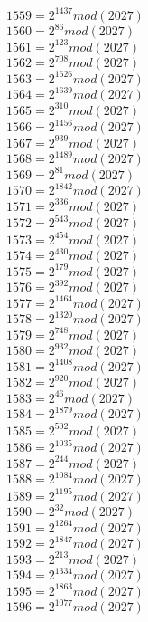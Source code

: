 \documentclass[12pt, letterpaper]{article}
\begin{document}
\begin{itemize}
\begin{multicols}{3}
$1559= 2^{1437} mod (2027)$\\
$1560= 2^{86} mod (2027)$\\
$1561= 2^{123} mod (2027)$\\
$1562= 2^{708} mod (2027)$\\
$1563= 2^{1626} mod (2027)$\\
$1564= 2^{1639} mod (2027)$\\
$1565= 2^{310} mod (2027)$\\
$1566= 2^{1456} mod (2027)$\\
$1567= 2^{939} mod (2027)$\\
$1568= 2^{1489} mod (2027)$\\
$1569= 2^{81} mod (2027)$\\
$1570= 2^{1842} mod (2027)$\\
$1571= 2^{336} mod (2027)$\\
$1572= 2^{543} mod (2027)$\\
$1573= 2^{454} mod (2027)$\\
$1574= 2^{430} mod (2027)$\\
$1575= 2^{179} mod (2027)$\\
$1576= 2^{392} mod (2027)$\\
$1577= 2^{1464} mod (2027)$\\
$1578= 2^{1320} mod (2027)$\\
$1579= 2^{748} mod (2027)$\\
$1580= 2^{932} mod (2027)$\\
$1581= 2^{1408} mod (2027)$\\
$1582= 2^{920} mod (2027)$\\
$1583= 2^{46} mod (2027)$\\
$1584= 2^{1879} mod (2027)$\\
$1585= 2^{502} mod (2027)$\\
$1586= 2^{1035} mod (2027)$\\
$1587= 2^{244} mod (2027)$\\
$1588= 2^{1084} mod (2027)$\\
$1589= 2^{1195} mod (2027)$\\
$1590= 2^{32} mod (2027)$\\
$1591= 2^{1264} mod (2027)$\\
$1592= 2^{1847} mod (2027)$\\
$1593= 2^{213} mod (2027)$\\
$1594= 2^{1334} mod (2027)$\\
$1595= 2^{1863} mod (2027)$\\
$1596= 2^{1077} mod (2027)$\\

\end{multicols}
\end{itemize}
\end{document}
